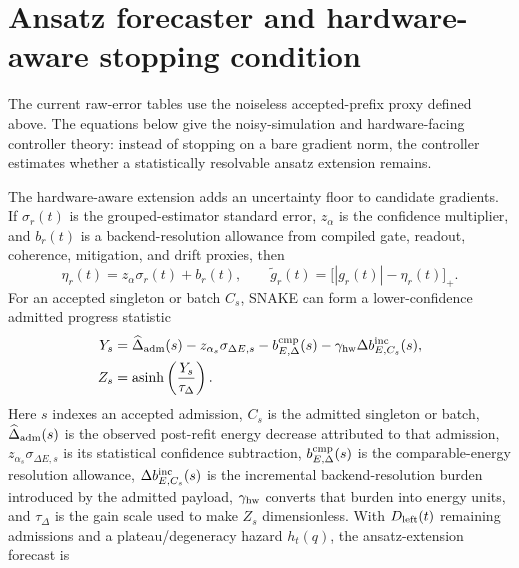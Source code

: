 \documentclass[
  reprint,
  amsmath,
  amssymb,
  aps,
  pra,
  nofootinbib,
  superscriptaddress,
  floatfix
]{revtex4-2}
\begin{document}
\section{Ansatz forecaster and hardware-aware stopping condition}
\label{app:static_controller_details}
\label{app:static_ansatz_schedule_details}
\label{app:gradient_resolution_floor}

The current raw-error tables use the noiseless accepted-prefix proxy
defined above. The equations below give the noisy-simulation and
hardware-facing controller theory: instead of stopping on a bare gradient norm,
the controller estimates whether a statistically resolvable ansatz extension
remains.

The hardware-aware extension adds an uncertainty floor to candidate gradients.  If $\sigma_r(t)$ is the grouped-estimator standard error, \(z_\alpha\) is the confidence multiplier, and $b_r(t)$ is a backend-resolution allowance from compiled gate, readout, coherence, mitigation, and drift proxies, then
\begin{equation}
\eta_r(t)=z_\alpha\sigma_r(t)+b_r(t),
\qquad
\widetilde g_r(t)=\bigl[|g_r(t)|-\eta_r(t)\bigr]_+ .
\label{eq:appendix_resolved_gradient}
\end{equation}
For an accepted singleton or batch $C_s$, SNAKE can form a lower-confidence admitted progress statistic
\begin{equation}
\begin{aligned}
Y_s&=
\widehat\Delta_{\rm adm}(s)
-z_{\alpha_s}\sigma_{\Delta E,s}
-b_{E,\Delta}^{\rm cmp}(s)
-\gamma_{\rm hw}\Delta b_{E,C_s}^{\rm inc}(s),
\\
Z_s&=\operatorname{asinh}\left(\frac{Y_s}{\tau_\Delta}\right).
\end{aligned}
\label{eq:appendix_net_admitted_gain}
\end{equation}
Here \(s\) indexes an accepted admission, \(C_s\) is the admitted singleton or batch, \(\widehat\Delta_{\rm adm}(s)\) is the observed post-refit energy decrease attributed to that admission, \(z_{\alpha_s}\sigma_{\Delta E,s}\) is its statistical confidence subtraction, \(b_{E,\Delta}^{\rm cmp}(s)\) is the comparable-energy resolution allowance, \(\Delta b_{E,C_s}^{\rm inc}(s)\) is the incremental backend-resolution burden introduced by the admitted payload, \(\gamma_{\rm hw}\) converts that burden into energy units, and \(\tau_\Delta\) is the gain scale used to make \(Z_s\) dimensionless.
With $D_{\rm left}(t)$ remaining admissions and a plateau/degeneracy hazard $h_t(q)$, the ansatz-extension forecast is
\end{document}
